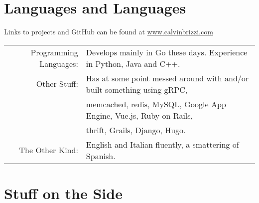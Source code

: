 \documentclass[a4paper,10pt]{article} %
\begin{document}


\section{Languages and Languages}
Links to projects and GitHub can be found at \href{www.calvinbrizzi.com}{www.calvinbrizzi.com}

\begin{tabular}{rl}
Programming Languages:& Develops mainly in Go these days. Experience in Python, Java and C++.\\
Other Stuff:& Has at some point messed around with and/or built something using gRPC,\\
	&memcached, redis, MySQL, Google App Engine, Vue.js, Ruby on Rails,\\
	&thrift, Grails, Django, Hugo.\\
The Other Kind: & English and Italian fluently, a smattering of Spanish.\\
\end{tabular}

\section{Stuff on the Side}
\end{document}
